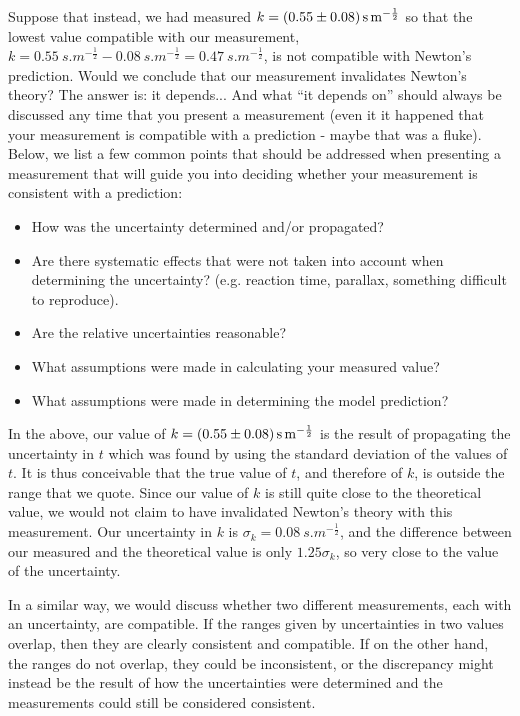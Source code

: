 Suppose that instead, we had measured $k=\SI{0.55 \pm 0.08}{s.m^{-\frac{1}{2}}}$ so that the lowest value compatible with our measurement, $k=\SI{0.55}{s.m^{-\frac{1}{2}}}-\SI{0.08}{s.m^{-\frac{1}{2}}}=\SI{0.47}{s.m^{-\frac{1}{2}}}$, is not compatible with Newton's prediction. Would we conclude that our measurement invalidates Newton's theory? The answer is: it depends... And what ``it depends on'' should always be discussed any time that you present a measurement (even it it happened that your measurement is compatible with a prediction - maybe that was a fluke). Below, we list a few common points that should be addressed when presenting a measurement that will guide you into deciding whether your measurement is consistent with a prediction:
\begin{itemize}
\item How was the uncertainty determined and/or propagated?
\item Are there systematic effects that were not taken into account when determining the uncertainty? (e.g. reaction time, parallax, something difficult to reproduce).
\item Are the relative uncertainties reasonable?
\item What assumptions were made in calculating your measured value?
\item What assumptions were made in determining the model prediction? 
\end{itemize}
In the above, our value of $k= \SI{0.55 \pm 0.08}{s.m^{-\frac{1}{2}}}$ is the result of propagating the uncertainty in $t$ which was found by using the standard deviation of the values of $t$. It is thus conceivable that the true value of $t$, and therefore of $k$, is outside the range that we quote. Since our value of $k$ is still quite close to the theoretical value, we would not claim to have invalidated Newton's theory with this measurement. Our uncertainty in $k$ is $\sigma_k=\SI{0.08}{s.m^{-\frac{1}{2}}}$, and the difference between our measured and the theoretical value is only $1.25\sigma_k$, so very close to the value of the uncertainty. 

In a similar way, we would discuss whether two different measurements, each with an uncertainty, are compatible. If the ranges given by uncertainties in two values overlap, then they are clearly consistent and compatible. If on the other hand, the ranges do not overlap, they could be inconsistent, or the discrepancy might instead be the result of how the uncertainties were determined and the measurements could still be considered consistent. 


